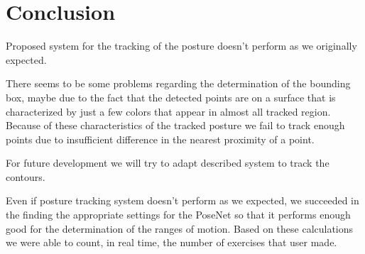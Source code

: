 
\chapter{Conclusion}
\par Proposed system for the tracking of the posture doesn\mbox{'}t perform as we originally expected.
\par There seems to be some problems regarding the determination of the bounding box, maybe due to the fact that the detected points are on a surface that is characterized by just a few colors that appear in almost all tracked region. Because of these characteristics of the tracked posture we fail to track enough points due to insufficient difference in the nearest proximity of a point. 

\par For future development we will try to adapt described system to track the contours.

\par Even if posture tracking system doesn\mbox{'}t perform as we expected, we succeeded in the finding the appropriate settings for the PoseNet so that it performs enough good for the determination of the ranges of motion. Based on these calculations we were able to count, in real time, the number of exercises that user made.